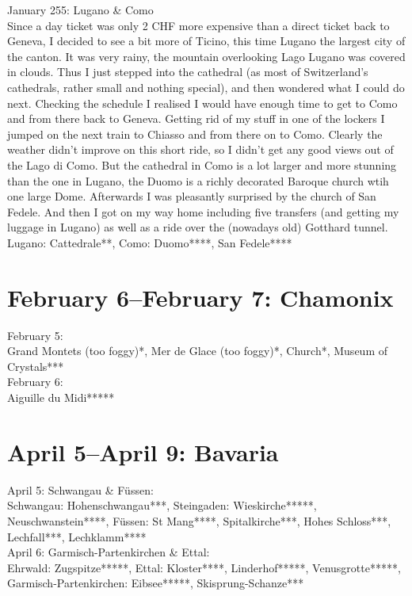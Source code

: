 January 255: Lugano \& Como\\
Since a day ticket was only 2 CHF more expensive than a direct ticket back to Geneva, I decided to see a bit more of Ticino, this time Lugano the largest city of the canton. It was very rainy, the mountain overlooking Lago Lugano was covered in clouds. Thus I just stepped into the cathedral (as most of Switzerland's cathedrals, rather small and nothing special), and then wondered what I could do next. Checking the schedule I realised I would have enough time to get to Como and from there back to Geneva. Getting rid of my stuff in one of the lockers I jumped on the next train to Chiasso and from there on to Como. Clearly the weather didn't improve on this short ride, so I didn't get any good views out of the Lago di Como. But the cathedral in Como is a lot larger and more stunning than the one in Lugano, the Duomo is a richly decorated Baroque church wtih one large Dome. Afterwards I was pleasantly surprised by the church of San Fedele. And then I got on my way home including five transfers (and getting my luggage in Lugano) as well as a ride over the (nowadays old) Gotthard tunnel.\\

Lugano: Cattedrale**, Como: Duomo****, San Fedele****

\section{February 6--February 7: Chamonix}
\label{Chamonix2010}

February 5:\\
Grand Montets (too foggy)*, Mer de Glace (too foggy)*, Church*, Museum of Crystals***\\

February 6:\\
Aiguille du Midi*****

\section{April 5--April 9: Bavaria}
\label{2010:Bavaria}

April 5: Schwangau \& F\"ussen:\\
Schwangau: Hohenschwangau***, Steingaden: Wieskirche*****, Neuschwanstein****, F\"ussen: St Mang****, Spitalkirche***, Hohes Schloss***, Lechfall***, Lechklamm****\\

April 6: Garmisch-Partenkirchen \& Ettal:\\
Ehrwald: Zugspitze*****, Ettal: Kloster****, Linderhof*****, Venusgrotte*****, Garmisch-Partenkirchen: Eibsee*****, Skisprung-Schanze***\\

